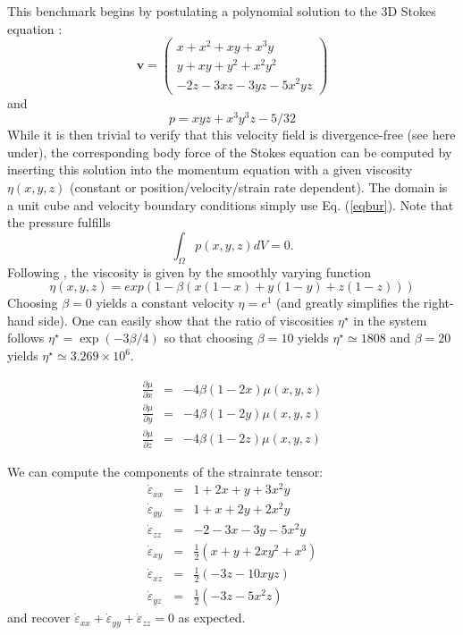 This benchmark begins by postulating a polynomial solution 
to the 3D Stokes equation \cite{dobo04}:
\begin{equation}
{\bm v}
=
\left(
\begin{array}{c}
x+x^2+xy+x^3y \\
y + xy + y^2 + x^2 y^2\\
-2z - 3xz - 3yz - 5x^2 yz
\end{array}
\right)
\label{eqbur}
\end{equation}
and
\begin{equation}
p = xyz + x^3 y^3z - 5/32
\end{equation}
While it is then trivial to verify that this velocity field is divergence-free (see here under),  
the corresponding body force of the Stokes equation can be computed by  
inserting this solution into the momentum equation with a given viscosity $\eta(x,y,z)$
(constant or position/velocity/strain rate dependent). 
The domain is a unit cube and velocity boundary conditions 
simply use Eq. (\ref{eqbur}). 
Note that the pressure fulfills 
\[
\int_\Omega p(x,y,z) dV = 0.  
\]
Following \cite{busa13}, the viscosity
is given by the smoothly varying function
\begin{equation}
\eta(x,y,z) = exp(1 - \beta(x(1 - x) + y(1 - y) + z(1 - z)))
\end{equation}
Choosing $\beta=0$ yields a constant velocity $\eta=e^1$ (and greatly simplifies the right-hand side).
One can easily show that the ratio of viscosities $\eta^\star$
in the system follows $\eta^\star=\exp(-3\beta/4)$ so that choosing $\beta=10$ yields
$\eta^\star\simeq 1808$ and $\beta=20$ yields $\eta^\star\simeq 3.269\times10^6$.

\begin{eqnarray}
\frac{\partial \mu}{\partial x}&=&-4\beta(1-2x)\mu(x,y,z)\\
\frac{\partial \mu}{\partial y}&=&-4\beta(1-2y)\mu(x,y,z)\\
\frac{\partial \mu}{\partial z}&=&-4\beta(1-2z)\mu(x,y,z)
\end{eqnarray}


We can compute the components of the strainrate tensor:
\begin{eqnarray}
\dot{\varepsilon}_{xx} &=& 1+2x+y+3x^2y\\
\dot{\varepsilon}_{yy} &=& 1+x+2y+2x^2y\\
\dot{\varepsilon}_{zz} &=& -2-3x-3y-5x^2y\\ 
\dot{\varepsilon}_{xy} &=&  \frac{1}{2} (x+y+2xy^2+x^3)\\
\dot{\varepsilon}_{xz} &=&  \frac{1}{2} (-3z-10xyz  )\\
\dot{\varepsilon}_{yz} &=&  \frac{1}{2} ( -3z -5x^2z )
\end{eqnarray}
and recover $\dot{\varepsilon}_{xx} +\dot{\varepsilon}_{yy} 
+\dot{\varepsilon}_{zz} =0$ as expected.

